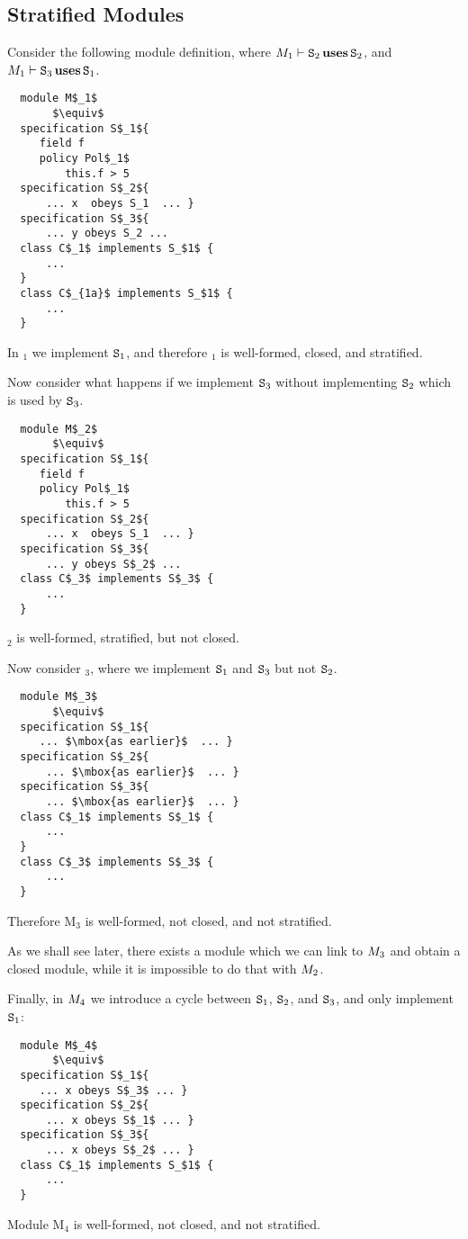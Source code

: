  
\subsection{Stratified Modules}
\label{problems:stratifiedModule}

Consider the following module definition, where $M_1 \vdash {\ensuremath{\textrm{\ttfamily{S}}}}_2 \,\textbf{\textrm{uses}}\, {\textrm{\ttfamily{S}}}_2$, and 
$M_1 \vdash {\ensuremath{\textrm{\ttfamily{S}}}}_3 \,\textbf{\textrm{uses}}\, {\textrm{\ttfamily{S}}}_1$.

  \begin{lstlisting}
  module M$_1$
       $\equiv$
  specification S$_1${
     field f
     policy Pol$_1$
         this.f > 5
  specification S$_2${
      ... x  obeys S_1  ... }
  specification S$_3${
      ... y obeys S_2 ... 
  class C$_1$ implements S_$1$ { 
      ...
  }
  class C$_{1a}$ implements S_$1$ { 
      ...
  }      
\end{lstlisting}
\noindent
In \M$_1$ we implement ${\textrm{\ttfamily{S}}}_1$, and therefore \M$_1$ is well-formed,  closed, and stratified.


Now consider what happens if we implement ${\textrm{\ttfamily{S}}}_3$ without implementing ${\textrm{\ttfamily{S}}}_2$ which is used by ${\textrm{\ttfamily{S}}}_3$.

 \begin{lstlisting}
  module M$_2$
       $\equiv$
  specification S$_1${
     field f
     policy Pol$_1$
         this.f > 5
  specification S$_2${
      ... x  obeys S_1  ... }
  specification S$_3${
      ... y obeys S$_2$ ... 
  class C$_3$ implements S$_3$ { 
      ...
  }
\end{lstlisting}
\noindent
 \M$_2$ is well-formed, stratified, but not  closed.

Now consider  \M$_3$, where we implement ${\textrm{\ttfamily{S}}}_1$ and ${\textrm{\ttfamily{S}}}_3$ but not ${\textrm{\ttfamily{S}}}_2$.

 \begin{lstlisting}
  module M$_3$
       $\equiv$
  specification S$_1${
     ... $\mbox{as earlier}$  ... }  
  specification S$_2${
      ... $\mbox{as earlier}$  ... }
  specification S$_3${
      ... $\mbox{as earlier}$  ... }
  class C$_1$ implements S$_1$ { 
      ...
  }
  class C$_3$ implements S$_3$ { 
      ...
  }      
\end{lstlisting}
\noindent
 Therefore M$_3$ is well-formed, not closed, and not stratified.

As we shall see later, there exists a module which we can link to $M_3$ and obtain a closed module, while it is impossible to do that with $M_2$.

Finally, in $M_4$ we introduce a cycle between ${\textrm{\ttfamily{S}}}_1$, ${\textrm{\ttfamily{S}}}_2$, and ${\textrm{\ttfamily{S}}}_3$, and only implement ${\textrm{\ttfamily{S}}}_1$: 
\begin{lstlisting}
  module M$_4$
       $\equiv$
  specification S$_1${
     ... x obeys S$_3$ ... }
  specification S$_2${
      ... x obeys S$_1$ ... }
  specification S$_3${
      ... x obeys S$_2$ ... }
  class C$_1$ implements S_$1$ { 
      ...
  }      
\end{lstlisting}
\noindent
Module M$_4$ is well-formed, not closed, and not stratified.

